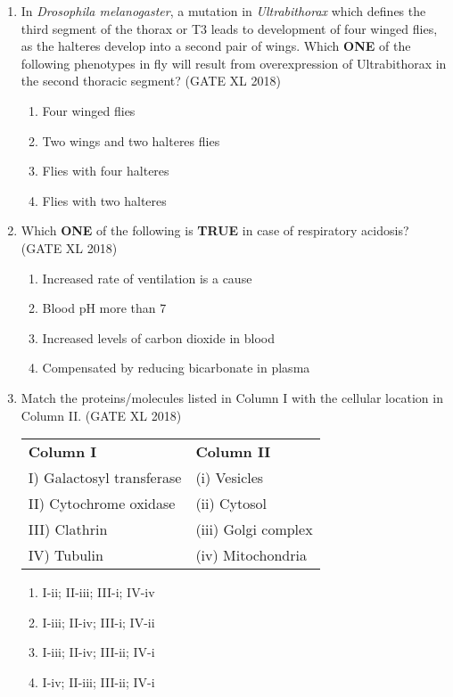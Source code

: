 \documentclass[14pt]{extarticle}
\begin{document}
\begin{flushleft}
\begin{enumerate}
\item In \textit{Drosophila melanogaster}, a mutation in \textit{Ultrabithorax} which defines the third segment of the thorax or T3 leads to development of four winged flies, as the halteres develop into a 
second pair of wings. Which \textbf{ONE} of the following phenotypes in fly will result from 
overexpression of Ultrabithorax in the second thoracic segment? 
    \hfill(GATE XL 2018)\\
    \begin{multicols}{2}
    \begin{enumerate}
        \item Four winged flies
        \item Two wings and two halteres flies
        \item Flies with four halteres
        \item Flies with two halteres
    \end{enumerate}
    \end{multicols}

    \item Which \textbf{ONE} of the following is \textbf{TRUE} in case of respiratory acidosis? \hfill(GATE XL 2018)\\
    \begin{enumerate}
        \item Increased rate of ventilation is a cause
        \item Blood pH more than 7
        \item Increased levels of carbon dioxide in blood
        \item Compensated by reducing bicarbonate in plasma
    \end{enumerate}

    \item Match the proteins/molecules listed in Column I with the cellular location in Column II. \hfill(GATE XL 2018)\\
\begin{tabular}{p{6cm} p{6cm}}
\textbf{Column I} & \textbf{Column II} \\
I) Galactosyl transferase & (i) Vesicles \\
II) Cytochrome oxidase & (ii) Cytosol \\
III) Clathrin & (iii) Golgi complex \\
IV) Tubulin & (iv) Mitochondria \\
\end{tabular}
    \begin{multicols}{2}
    \begin{enumerate}
        \item I-ii; II-iii; III-i; IV-iv
        \item I-iii; II-iv; III-i; IV-ii
        \item I-iii; II-iv; III-ii; IV-i
        \item I-iv; II-iii; III-ii; IV-i
    \end{enumerate}
    \end{multicols}


\end{enumerate}
\end{flushleft}
\end{document}
